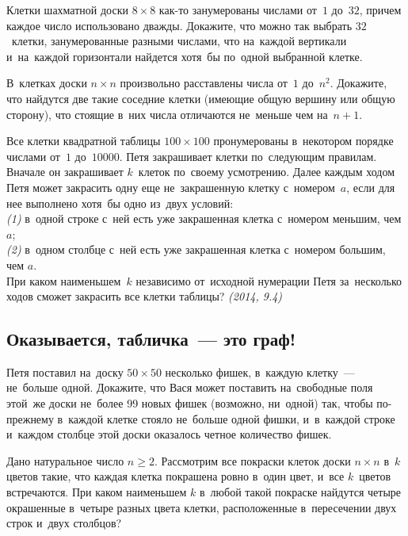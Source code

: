 \begin{problems}
\item
Клетки шахматной доски $8 \times 8$ как-то занумерованы числами от~$1$ до~$32$,
причем каждое число использовано дважды.
Докажите, что можно так выбрать $32$~клетки, занумерованные разными числами,
что на~каждой вертикали и~на~каждой горизонтали найдется хотя~бы по~одной
выбранной клетке.


\item
В~клетках доски $n \times n$ произвольно расставлены числа от~$1$ до~$n^2$.
Докажите, что найдутся две такие соседние клетки (имеющие общую вершину или
общую сторону), что стоящие в~них числа отличаются не~меньше чем на~$n + 1$.

\item
Все клетки квадратной таблицы $100 \times 100$ пронумерованы в~некотором
порядке числами от~$1$ до~$10000$.
Петя закрашивает клетки по~следующим правилам.
Вначале он закрашивает $k$~клеток по~своему усмотрению.
Далее каждым ходом Петя может закрасить одну еще не~закрашенную клетку
с~номером~$a$, если для нее выполнено хотя~бы одно из~двух условий:
\\
\emph{(1)}
в~одной строке с~ней есть уже закрашенная клетка с~номером меньшим, чем $a$;
\\
\emph{(2)}
в~одном столбце с~ней есть уже закрашенная клетка с~номером большим, чем $a$.
\\
При каком наименьшем~$k$ независимо от~исходной нумерации Петя за~несколько
ходов сможет закрасить все клетки таблицы?
\emph{(2014, 9.4)}

\end{problems}

\subsection*{Оказывается, табличка~--- это граф!}

\begin{problems}

\item
Петя поставил на~доску $50 \times 50$ несколько фишек, в~каждую клетку~---
не~больше одной.
Докажите, что Вася может поставить на~свободные поля этой~же доски не~более
99 новых фишек (возможно, ни~одной) так, чтобы по-прежнему в~каждой клетке
стояло не~больше одной фишки, и~в~каждой строке и~каждом столбце этой доски
оказалось четное количество фишек.

\item
Дано натуральное число $n \geq 2$.
Рассмотрим все покраски клеток доски $n \times n$ в~$k$ цветов такие, что
каждая клетка покрашена ровно в~один цвет, и~все $k$~цветов встречаются.
При каком наименьшем $k$ в~любой такой покраске найдутся четыре окрашенные
в~четыре разных цвета клетки, расположенные в~пересечении двух строк и~двух
столбцов?

\end{problems}

